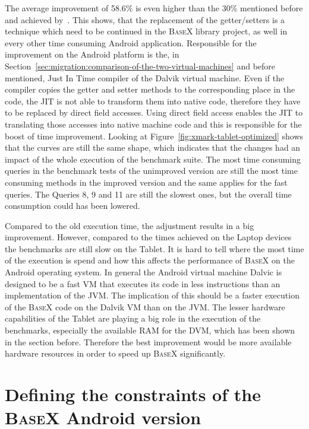 The average improvement of 58.6\% is even higher than the 30\% mentioned before and achieved by~\cite{toninievlautatingandroid}.
This shows, that the replacement of the getter/setters is a technique which need to be continued in the \textsc{BaseX} library project, as well in every other time consuming Android application.
Responsible for the improvement on the Android platform is the, in Section~\ref{sec:migration:comparison-of-the-two-virtual-machines} and before mentioned, Just In Time compiler of the Dalvik virtual machine. 
Even if the compiler copies the getter and setter methods to the corresponding place in the code, the JIT is not able to transform them into native code, therefore they have to be replaced by direct field accesses.
Using direct field access enables the JIT to translating those accesses into native machine code and this is responsible for the boost of time improvement.
Looking at Figure~\ref{fig:xmark-tablet-optimized} shows that the curves are still the same shape, which indicates that the changes had an impact of the whole execution of the benchmark suite.
The most time consuming queries in the benchmark tests of the unimproved version are still the most time consuming methods in the improved version and the same applies for the fast queries.
The Queries 8, 9 and 11 are still the slowest ones, but the overall time consumption could has been lowered.



Compared to the old execution time, the adjustment results in a big improvement.
However, compared to the times achieved on the Laptop devices the benchmarks are still slow on the Tablet.
It is hard to tell where the most time of the execution is spend and how this affects the performance of \textsc{BaseX} on the Android operating system.
In general the Android virtual machine Dalvic is designed to be a fast VM that executes its code in less instructions than an implementation of the JVM.
The implication of this should be a faster execution of the \textsc{BaseX} code on the Dalvik VM than on the JVM.
The lesser hardware capabilities of the Tablet are playing a big role in the execution of the benchmarks, especially the available RAM for the DVM, which has been shown in the section before.
Therefore the best improvement would be more available hardware resources in order to speed up \textsc{BaseX} significantly.

\section{Defining the constraints of the \textsc{BaseX} Android version}
\label{sec:defining-the-constraints}



